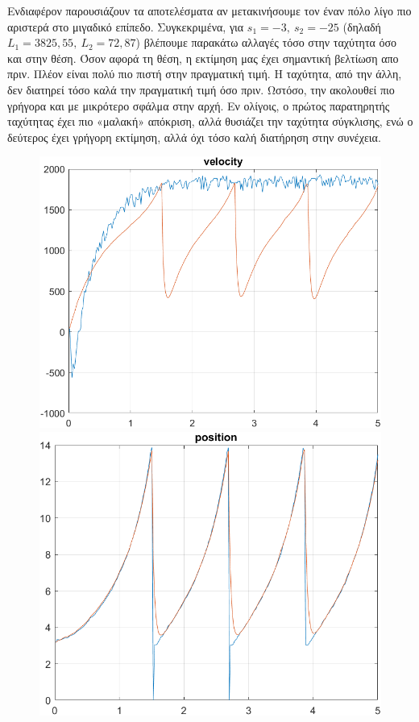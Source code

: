 Ενδιαφέρον παρουσιάζουν τα αποτελέσματα αν μετακινήσουμε τον έναν πόλο λίγο πιο αριστερά στο μιγαδικό επίπεδο. Συγκεκριμένα, για $s_1 = -3,\ s_2 = -25$ (δηλαδή $L_1 = 3825,55,\ L_2 = 72,87$) βλέπουμε παρακάτω αλλαγές τόσο στην ταχύτητα όσο και στην θέση. Όσον αφορά τη θέση, η εκτίμηση μας έχει σημαντική βελτίωση απο πριν. Πλέον είναι πολύ πιο πιστή στην πραγματική τιμή. Η ταχύτητα, από την άλλη, δεν διατηρεί τόσο καλά την πραγματική τιμή όσο πριν. Ωστόσο, την ακολουθεί πιο γρήγορα και με μικρότερο σφάλμα στην αρχή. Εν ολίγοις, ο πρώτος παρατηρητής ταχύτητας έχει πιο «μαλακή» απόκριση, αλλά θυσιάζει την ταχύτητα σύγκλισης, ενώ ο δεύτερος έχει γρήγορη εκτίμηση, αλλά όχι τόσο καλή διατήρηση στην συνέχεια.

\begin{figure}[H]
    \centering
    \begin{minipage}{0.45\textwidth}
        \includegraphics[width=\linewidth]{Images/lab4/1/ligo xeirotero/vel.png}
    \end{minipage}
    \hfill
    \begin{minipage}{0.45\textwidth}
        \includegraphics[width=\linewidth]{Images/lab4/1/ligo xeirotero/pos.png}
    \end{minipage}
\end{figure}
